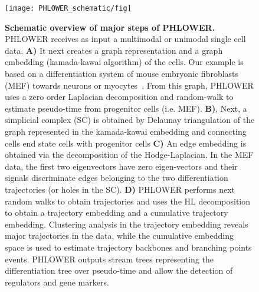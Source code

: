 \begin{figure}[!ht]
	\centering
	\texttt{[image: PHLOWER\_schematic/fig]}
	\vspace{0.1cm}
	\caption[Schematic overview of major steps of PHLOWER.]{\textbf{Schematic overview of major steps of PHLOWER.} PHLOWER receives as input a multimodal or unimodal single cell data. \textbf{A)} It next creates a graph representation and a graph embedding (kamada-kawai algorithm) of the cells. Our example is based on a differentiation system of mouse embryonic fibroblasts (MEF) towards neurons or myocytes~\citep{treutlein2016dissecting}. From this graph, PHLOWER uses a zero order Laplacian decomposition and random-walk to estimate pseudo-time from progenitor cells (i.e. MEF). \textbf{B)}, Next, a simplicial complex (SC) is obtained by Delaunay triangulation of the graph represented in the kamada-kawai embedding and connecting cells end state cells with progenitor cells \textbf{C)} An edge embedding is obtained via the decomposition of the Hodge-Laplacian. In the MEF data, the first two eigenvectors have zero eigen-vectors and their signals discriminate edges belonging to the two differentiation trajectories (or holes in the SC). \textbf{D)} PHLOWER performs next random walks to obtain trajectories and uses the HL decomposition to obtain a trajectory embedding and a cumulative trajectory embedding. Clustering analysis in the trajectory embedding reveals major trajectories in the data, while the cumulative embedding space is used to estimate trajectory backbones and branching points events. PHLOWER outputs stream trees representing the differentiation tree over pseudo-time and allow the detection of regulators and gene markers.}
	\label{fig:PHLOWER_schematic}
\end{figure}

